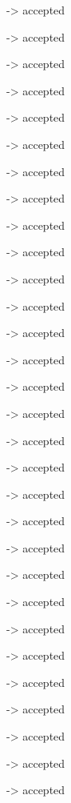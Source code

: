 -> accepted

-> accepted

-> accepted

-> accepted

-> accepted

-> accepted

-> accepted

-> accepted

-> accepted

-> accepted

-> accepted

-> accepted

-> accepted

-> accepted

-> accepted

-> accepted

-> accepted

-> accepted

-> accepted

-> accepted

-> accepted

-> accepted

-> accepted

-> accepted

-> accepted

-> accepted

-> accepted

-> accepted

-> accepted

-> accepted

